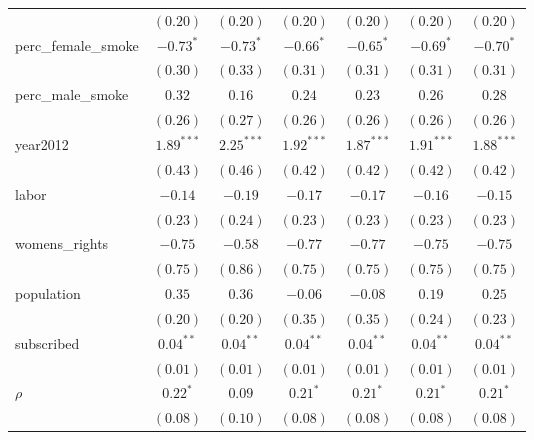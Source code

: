 \begin{table}[!h]
\begin{center}
\begin{tabular}{l c c c c c c }
                        & $(0.20)$     & $(0.20)$     & $(0.20)$     & $(0.20)$     & $(0.20)$     & $(0.20)$     \\
perc\_female\_smoke     & $-0.73^{*}$  & $-0.73^{*}$  & $-0.66^{*}$  & $-0.65^{*}$  & $-0.69^{*}$  & $-0.70^{*}$  \\
                        & $(0.30)$     & $(0.33)$     & $(0.31)$     & $(0.31)$     & $(0.31)$     & $(0.31)$     \\
perc\_male\_smoke       & $0.32$       & $0.16$       & $0.24$       & $0.23$       & $0.26$       & $0.28$       \\
                        & $(0.26)$     & $(0.27)$     & $(0.26)$     & $(0.26)$     & $(0.26)$     & $(0.26)$     \\
year2012                & $1.89^{***}$ & $2.25^{***}$ & $1.92^{***}$ & $1.87^{***}$ & $1.91^{***}$ & $1.88^{***}$ \\
                        & $(0.43)$     & $(0.46)$     & $(0.42)$     & $(0.42)$     & $(0.42)$     & $(0.42)$     \\
labor                   & $-0.14$      & $-0.19$      & $-0.17$      & $-0.17$      & $-0.16$      & $-0.15$      \\
                        & $(0.23)$     & $(0.24)$     & $(0.23)$     & $(0.23)$     & $(0.23)$     & $(0.23)$     \\
womens\_rights          & $-0.75$      & $-0.58$      & $-0.77$      & $-0.77$      & $-0.75$      & $-0.75$      \\
                        & $(0.75)$     & $(0.86)$     & $(0.75)$     & $(0.75)$     & $(0.75)$     & $(0.75)$     \\
population              & $0.35$       & $0.36$       & $-0.06$      & $-0.08$      & $0.19$       & $0.25$       \\
                        & $(0.20)$     & $(0.20)$     & $(0.35)$     & $(0.35)$     & $(0.24)$     & $(0.23)$     \\
subscribed              & $0.04^{**}$  & $0.04^{**}$  & $0.04^{**}$  & $0.04^{**}$  & $0.04^{**}$  & $0.04^{**}$  \\
                        & $(0.01)$     & $(0.01)$     & $(0.01)$     & $(0.01)$     & $(0.01)$     & $(0.01)$     \\
$\rho$                  & $0.22^{*}$   & $0.09$       & $0.21^{*}$   & $0.21^{*}$   & $0.21^{*}$   & $0.21^{*}$   \\
                        & $(0.08)$     & $(0.10)$     & $(0.08)$     & $(0.08)$     & $(0.08)$     & $(0.08)$     \\

\end{tabular}
\end{center}
\end{table}

